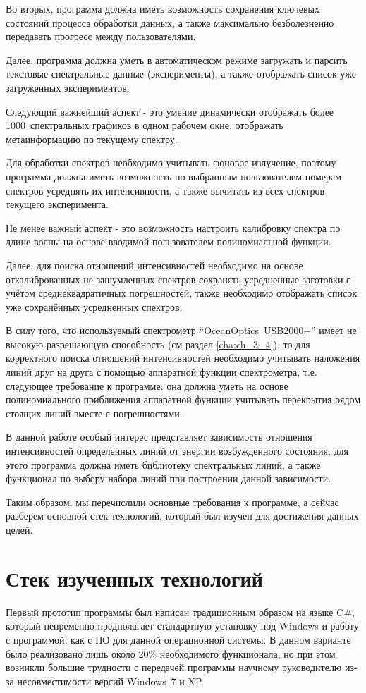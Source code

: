 Во вторых, программа должна иметь возможность сохранения ключевых состояний процесса обработки данных,
а также максимально безболезненно передавать прогресс между пользователями.

Далее, программа должна уметь в автоматическом режиме загружать и парсить текстовые спектральные данные
(эксперименты), а также отображать список уже загруженных экспериментов.

Следующий важнейший аспект - это умение динамически отображать более 1000~спектральных графиков в одном
рабочем окне, отображать метаинформацию по текущему спектру.

Для обработки спектров необходимо учитывать фоновое излучение, поэтому программа должна иметь возможность по
выбранным пользователем номерам спектров усреднять их интенсивности, а также вычитать из всех спектров текущего эксперимента.

Не менее важный аспект - это возможность настроить калибровку спектра по длине волны на основе вводимой пользователем полиномиальной функции.

Далее, для поиска отношений интенсивностей необходимо на основе откалиброванных не зашумленных спектров сохранять
усредненные заготовки с учётом среднеквадратичных погрешностей, также необходимо отображать
список уже сохранённых усредненных спектров.

В силу того, что используемый спектрометр  “OceanOptics~USB2000+” имеет не высокую разрешающую
способность (см раздел \ref{cha:ch_3_4}), то для корректного поиска отношений интенсивностей
необходимо учитывать наложения линий друг на друга с помощью аппаратной функции спектрометра,
т.е. следующее требование к программе: она должна уметь на основе полиномиального приближения аппаратной
функции учитывать перекрытия рядом стоящих линий вместе с погрешностями.

В данной работе особый интерес представляет зависимость отношения интенсивностей определенных линий от энергии
возбужденного состояния, для этого программа должна иметь библиотеку спектральных линий, а также функционал
по выбору набора линий при построении данной зависимости.

Таким образом, мы перечислили основные требования к программе, а сейчас разберем основной стек технологий,
который был изучен для достижения данных целей.

\section{Стек изученных технологий}
Первый прототип программы был написан традиционным образом на языке C\#, который непременно предполагает
стандартную установку под Windows и работу с программой, как с ПО для данной операционной системы.
В данном варианте было реализовано лишь около 20\% необходимого функционала, но при этом возникли большие трудности
с передачей программы научному руководителю из-за несовместимости версий Windows~7 и XP.

